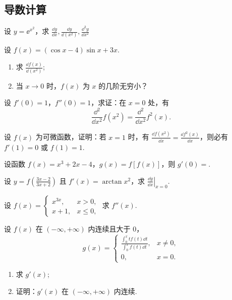\subsection{导数计算}
	
	\begin{ti}
		设 $y = \ee^{x^{2}}$，求 $\frac{\dd{y}}{\dd{x}}, \frac{\dd{y}}{\dd{\left( x^{2} \right)}}, \frac{\dd^{2}{y}}{\dd{x^{2}}}$
	\end{ti}

	\begin{ti}
		设 $f(x) = (\cos x - 4)\sin x + 3x$.
		\begin{enumerate}
			\item 求 $\frac{\dd{f(x)}}{\dd{\left( x^{2} \right)}}$;
			\item 当 $x \to 0$ 时，$f(x)$ 为 $x$ 的几阶无穷小？
		\end{enumerate}
	\end{ti}

	\begin{ti}
		设 $f'(0) = 1$，$f''(0) = 1$，求证：在 $x = 0$ 处，有
		\[
			\frac{\dd^{2}}{\dd{x^{2}}} f\left( x^{2} \right) = \frac{\dd^{2}}{\dd{x^{2}}} f^{2}(x).
		\]
	\end{ti}

	\begin{ti}
		设 $f(x)$ 为可微函数，证明：若 $x = 1$ 时，有 $\frac{\dd{f\left( x^{2} \right)}}{\dd{x}} = \frac{\dd{f^{2}(x)}}{\dd{x}}$，则必有 $f'(1) = 0$ 或 $f(1) = 1$.
	\end{ti}
	
	\begin{ti}
		设函数 $f(x) = x^{3} + 2x - 4$，$g(x) = f[f(x)]$，则 $g'(0) =$.
	\end{ti}

	\begin{ti}
		设 $y = f\left( \frac{3x - 2}{3x + 2} \right)$ 且 $f'(x) = \arctan x^{2}$，求 $\left. \frac{\dd{y}}{\dd{x}} \right|_{x = 0}$.
	\end{ti}

	\begin{ti}
		设 $f(x) = \begin{cases}
			x^{3x}, & x > 0,\\
			x + 1, & x \leq 0,
		\end{cases}$ 求 $f''(x)$.
	\end{ti}

	\begin{ti}
		设 $f(x)$ 在 $(-\infty,+\infty)$ 内连续且大于 $0$，
		\[
			g(x) = \begin{cases}
				\frac{\int_{0}^{x} tf(t) \dd{t}}{\int_{0}^{x} f(t) \dd{t}}, & x \ne 0,\\
				0, & x = 0.
			\end{cases}
		\]
		\begin{enumerate}
			\item 求 $g'(x)$;
			\item 证明：$g'(x)$ 在 $(-\infty,+\infty)$ 内连续.
		\end{enumerate}
	\end{ti}

